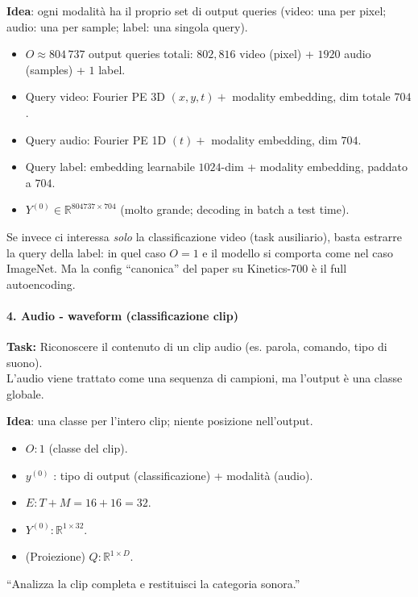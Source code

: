 \documentclass[
  11pt,
]{article}
\begin{document}
\textbf{Idea}: ogni modalità ha il proprio set di output queries (video: una per pixel; audio: una per sample; label: una singola query).

\begin{itemize}
\item \(O \approx 804\,737\) output queries totali: $802{,}816$ video (pixel) + $1920$ audio (samples) + $1$ label.
\item Query video: Fourier PE 3D $(x, y, t) + $ modality embedding, dim totale $704$.
\item Query audio: Fourier PE 1D $(t) + $ modality embedding, dim $704$.
\item Query label: embedding learnabile $1024$-dim + modality embedding, paddato a $704$.
\item $Y^{(0)} \in \mathbb{R}^{804737 \times 704}$ (molto grande; decoding in batch a test time).
\end{itemize}

Se invece ci interessa \emph{solo} la classificazione video (task ausiliario), basta estrarre la query della label: in quel caso $O = 1$ e il modello si comporta come nel caso ImageNet. Ma la config ``canonica'' del paper su Kinetics-700 è il full autoencoding.

\paragraph{4. \textbf{Audio - waveform (classificazione clip)}}

\textbf{Task:} Riconoscere il contenuto di un clip audio (es. parola,
comando, tipo di suono).\\
L'audio viene trattato come una sequenza di campioni, ma l'output è una
classe globale.

\textbf{Idea}: una classe per l'intero clip; niente
posizione nell'output.

\begin{itemize}
\item
  \(O:1\) (classe del clip).
\item
  \(y^{(0)}\) : tipo di output (classificazione) + modalità (audio).
\item
  \(E:T + M = 16 + 16 = 32\).
\item
  \(Y^{(0)}:\mathbb{R}^{1 \times 32}\).
\item
  (Proiezione) \(Q:\mathbb{R}^{1 \times D}\).
\end{itemize}


``Analizza la clip completa e restituisci la categoria sonora.''
\end{document}
